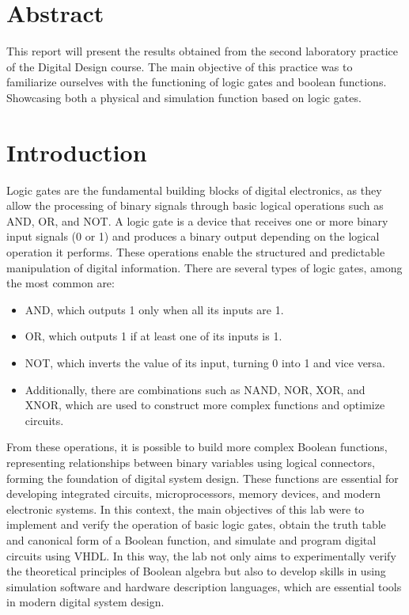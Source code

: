 \documentclass[12pt]{article}  %
\begin{document}
\section{Abstract} %
This report will present the results obtained from the second laboratory practice of the Digital Design course. The main objective of this practice was to familiarize ourselves with the
functioning of logic gates and boolean functions. Showcasing both a physical and simulation function based on logic gates.
\section{Introduction} %
Logic gates are the fundamental building blocks of digital electronics, as they allow the processing of binary signals through basic logical operations such as AND, OR, and NOT. A logic gate is a device that receives one or more binary input signals (0 or 1) and produces a binary output depending on the logical operation it performs. These operations enable the structured and predictable manipulation of digital information.
There are several types of logic gates, among the most common are:
\begin{itemize}
  \item AND, which outputs 1 only when all its inputs are 1.
  \item OR, which outputs 1 if at least one of its inputs is 1.
  \item NOT, which inverts the value of its input, turning 0 into 1 and vice versa.
  \item Additionally, there are combinations such as NAND, NOR, XOR, and XNOR, which are used to construct more complex functions and optimize circuits.
\end{itemize}\cite{UNAMCompuertas}
From these operations, it is possible to build more complex Boolean functions, representing relationships between binary variables using logical connectors, forming the foundation of digital system design. These functions are essential for developing integrated circuits, microprocessors, memory devices, and modern electronic systems.
In this context, the main objectives of this lab were to implement and verify the operation of basic logic gates, obtain the truth table and canonical form of a Boolean function, and simulate and program digital circuits using VHDL.
In this way, the lab not only aims to experimentally verify the theoretical principles of Boolean algebra but also to develop skills in using simulation software and hardware description languages, which are essential tools in modern digital system design.
\end{document}
